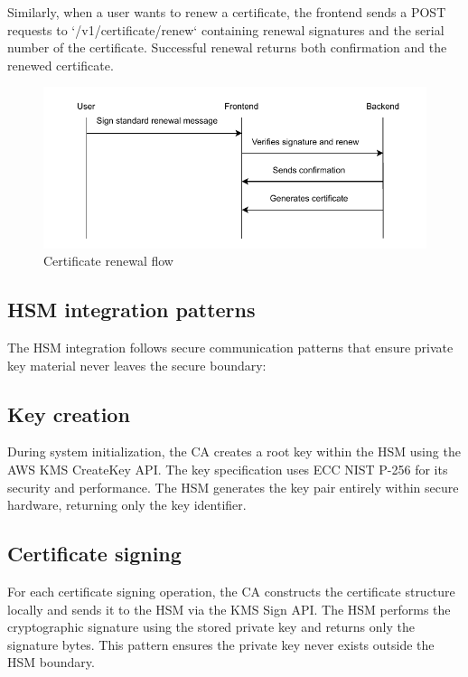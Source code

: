 Similarly, when a user wants to renew a certificate, the frontend sends a POST 
requests to `/v1/certificate/renew` containing renewal signatures and the serial number of the 
certificate. Successful renewal returns both confirmation and the renewed certificate.

\begin{figure}[h!]
    \centering
    \includegraphics[keepaspectratio, width=\textwidth]{Pic/renew_certificate.pdf}
    \caption{Certificate renewal flow}
    \label{fig:certificate-renewal-flow}
\end{figure}

\subsection{HSM integration patterns}

The HSM integration follows secure communication patterns 
that ensure private key material never leaves the secure boundary:

\subsection{Key creation}
During system initialization, the CA creates a root key 
within the HSM using the AWS KMS CreateKey API. The key specification uses 
ECC NIST P-256 for its security and performance. The HSM generates the key 
pair entirely within secure hardware, returning only the key identifier.

\subsection{Certificate signing}
For each certificate signing operation, the CA 
constructs the certificate structure locally and sends it to the HSM via the 
KMS Sign API. The HSM performs the cryptographic signature using the stored 
private key and returns only the signature bytes. This pattern ensures the 
private key never exists outside the HSM boundary.

